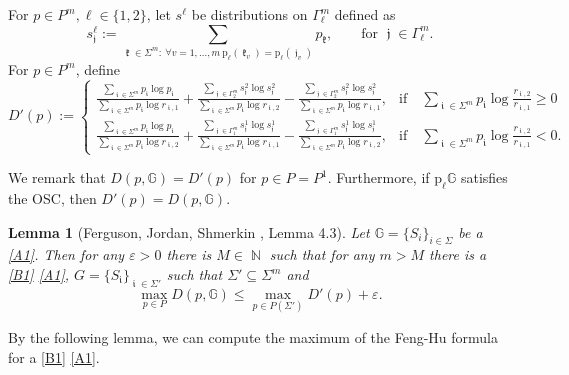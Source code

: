 \documentclass[a4paper, 11pt]{article}
\DeclareMathOperator{\N}{\mathbb{N}}
\DeclareMathOperator{\iii}{\mathfrak{i}}
\DeclareMathOperator{\jjj}{\mathfrak{j}}
\DeclareMathOperator{\kkk}{\mathfrak{k}}
\numberwithin{equation}{section}
\theoremstyle{plain}
\newtheorem{lemma}[theorem]{Lemma}
\theoremstyle{remark}
\theoremstyle{definition}
\begin{document}
For $p \in P^m, \ell \in \{1,2\}$, let $s^\ell$ be distributions on $\Gamma_\ell^{m}$ defined as 
\[ 
s^{\ell}_{\jjj} := \sum_{\kkk \in \Sigma^m:\ \forall v = 1,\dots,m\ \mathrm{p}_\ell (\kkk_v)= \mathrm{p}_\ell (\jjj_v)}p_{\kkk}, \qquad \text{for  } \jjj \in \Gamma_\ell^{m}. 
\]
For $p \in P^m$, define 
\begin{equation*}\label{eq:defD}
	D'(p) := \begin{cases}
		\displaystyle
		\frac{\sum\limits_{\iii \in \Sigma^m} p_{\iii} \log p_{\iii}}{\sum\limits_{\iii \in \Sigma^m} p_{\iii} \log r_{\iii,1}}
		+ \frac{\sum\limits_{\jjj \in \Gamma_2^{m}} s^{2}_{\jjj} \log s^{2}_{\jjj}}{\sum\limits_{\iii \in \Sigma^m} p_{\iii} \log r_{{\iii},2}}
		- \frac{\sum\limits_{{\jjj} \in \Gamma_2^{m}} s^{2}_{\jjj} \log s^{2}_{\jjj}}{\sum\limits_{\iii \in \Sigma^m} p_{\iii} \log r_{{\iii},1}},  & \text{if} \quad \sum\limits_{\iii \in \Sigma^m} p_{\iii} \log\frac{r_{{\iii},2}}{ r_{{\iii},1}} \geq 0 \\[25pt]
		\displaystyle
		\frac{\sum\limits_{\iii \in \Sigma^m} p_{\iii} \log p_{\iii}}{\sum\limits_{\iii \in \Sigma^m} p_{\iii} \log r_{\iii,2}}
		+ \frac{\sum\limits_{{\jjj} \in \Gamma_1^{m}} s^{1}_{\jjj} \log s^{1}_{\jjj}}{\sum\limits_{\iii \in \Sigma^m} p_{\iii} \log r_{{\iii},1}}
		- \frac{\sum\limits_{{\jjj} \in \Gamma_1^{m}} s^{1}_{\jjj} \log s^{1}_{\jjj}}{\sum\limits_{\iii \in \Sigma^m} p_{\iii} \log r_{{\iii},2}},  & \text{if} \quad \sum\limits_{\iii \in \Sigma^m} p_{\iii} \log\frac{r_{{\iii},2}}{r_{{\iii},1}} < 0.
	\end{cases}
\end{equation*}

We remark that $D(p, \mathbb{G}) = D'(p)$ for $p \in P = P^1$. Furthermore, if $\mathrm{p}_\ell\mathbb{G}$ satisfies the OSC, then $D'(p) = D(p,\mathbb{G})$.

\begin{lemma}[Ferguson, Jordan, Shmerkin \cite{ferguson2009hausdorffdimensionprojectionsselfaffine}, Lemma 4.3] \label{lemma:hhomogen2}
Let $\mathbb{G} = \{S_i\}_{i \in \Sigma}$ be a \ref{A1}. Then for any $\varepsilon > 0$ there is $M \in \N$ such that for any $m > M$ there is a \ref{B1} \ref{A1}, $G = \{S_{\iii}\}_{\iii \in \Sigma'}$ such that $\Sigma' \subseteq \Sigma^m$ and 
\[ \max_{p \in P}D(p,\mathbb{G}) \leq  \max_{p \in P(\Sigma')}D'(p) + \varepsilon .\]
\end{lemma}

By the following lemma, we can compute the maximum of the Feng-Hu formula for a \ref{B1} \ref{A1}.
\end{document}

